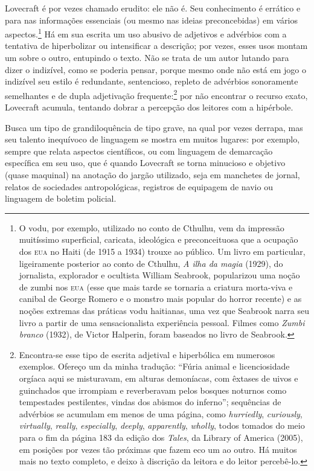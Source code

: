Lovecraft é por vezes chamado erudito: ele não é. Seu
conhecimento é errático e para nas informações essenciais (ou mesmo nas
ideias preconcebidas) em vários aspectos.\footnote{O vodu, por exemplo,
  utilizado no conto de Cthulhu, vem da impressão muitíssimo
  superficial, caricata, ideológica e preconceituosa que a ocupação dos
  \textsc{eua} no Haiti (de 1915 a 1934) trouxe ao público. Um livro em
  particular, ligeiramente posterior ao conto de Cthulhu, \emph{A ilha da magia} (1929), do jornalista, explorador e ocultista William
  Seabrook, popularizou uma noção de zumbi nos \textsc{eua}
  (esse que mais tarde se tornaria a criatura morta-viva e canibal de
  George Romero e o monstro mais popular do horror recente) e as noções
  extremas das práticas vodu haitianas, uma vez que Seabrook narra seu
  livro a partir de uma sensacionalista experiência pessoal. Filmes como
  \emph{Zumbi branco} (1932), de Victor Halperin, foram baseados no
  livro de Seabrook.} Há em sua escrita um uso abusivo de adjetivos e
advérbios com a tentativa de hiperbolizar ou intensificar a descrição;
por vezes, esses usos montam um sobre o outro, entupindo o texto. Não se
trata de um autor lutando para dizer o indizível, como se poderia
pensar, porque mesmo onde não está em jogo o indizível seu estilo é
redundante, sentencioso, repleto de advérbios sonoramente semelhantes e
de dupla adjetivação frequente:\footnote{Encontra-se esse tipo de escrita
  adjetival e hiperbólica em numerosos exemplos. Ofereço um da minha
  tradução: ``Fúria animal e licenciosidade orgíaca aqui se misturavam,
  em alturas demoníacas, com êxtases de uivos e guinchados que irrompiam
  e reverberavam pelos bosques noturnos como tempestades pestilentes,
  vindas dos abismos do inferno''; sequências de advérbios se acumulam
  em menos de uma página, como \emph{hurriedly}, \emph{curiously},
  \emph{virtually}, \emph{really}, \emph{especially}, \emph{deeply},
  \emph{apparently}, \emph{wholly}, todos tomados do meio para o fim da
  página 183 da edição dos \emph{Tales}, da Library of America (2005),
  em posições por vezes tão próximas que fazem eco um ao outro. Há
  muitos mais no texto completo, e deixo à discrição da leitora e do
  leitor percebê-lo.} por não encontrar o recurso exato, Lovecraft
acumula, tentando dobrar a percepção dos leitores com a hipérbole.

Busca um tipo de grandiloquência de tipo grave, na qual por vezes
derrapa, mas seu talento inequívoco de linguagem se mostra em muitos
lugares: por exemplo, sempre que relata aspectos científicos, ou com
linguagem de demarcação específica em seu uso, que é quando Lovecraft se
torna minucioso e objetivo (quase maquinal) na anotação do jargão
utilizado, seja em manchetes de jornal, relatos de sociedades
antropológicas, registros de equipagem de navio ou linguagem de boletim
policial.

